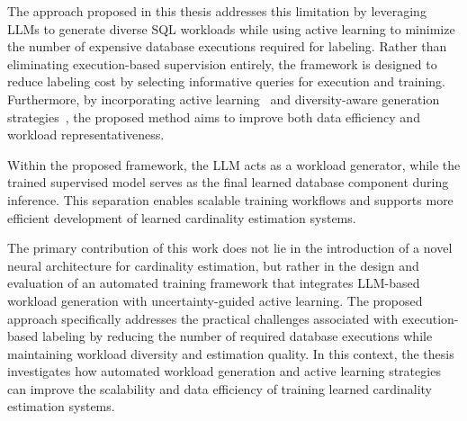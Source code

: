 The approach proposed in this thesis addresses this limitation by leveraging LLMs to generate diverse SQL workloads while using active learning to minimize the number of expensive database executions required for labeling. Rather than eliminating execution-based supervision entirely, the framework is designed to reduce labeling cost by selecting informative queries for execution and training. Furthermore, by incorporating active learning~\cite{DBLP:journals/tnn/LiWCJDO25} and diversity-aware generation strategies~\cite{DBLP:journals/corr/abs-2503-24228}, the proposed method aims to improve both data efficiency and workload representativeness.

Within the proposed framework, the LLM acts as a workload generator, while the trained supervised model serves as the final learned database component during inference. This separation enables scalable training workflows and supports more efficient development of learned cardinality estimation systems.

The primary contribution of this work does not lie in the introduction of a novel neural architecture for cardinality estimation, but rather in the design and evaluation of an automated training framework that integrates LLM-based workload generation with uncertainty-guided active learning. The proposed approach specifically addresses the practical challenges associated with execution-based labeling by reducing the number of required database executions while maintaining workload diversity and estimation quality. In this context, the thesis investigates how automated workload generation and active learning strategies can improve the scalability and data efficiency of training learned cardinality estimation systems.